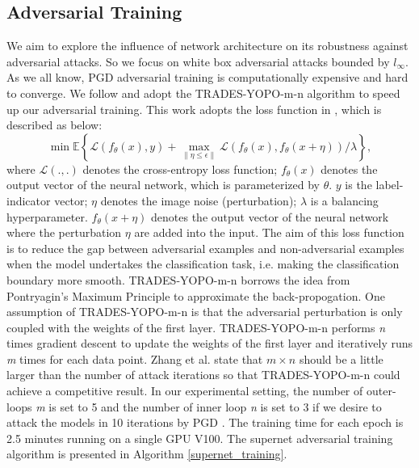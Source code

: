 \documentclass[journal]{IEEEtran}
\newcommand{\revised}[1]{{\color{black} #1}}
\begin{document}
\subsection{\textbf{Adversarial Training}}
We aim to explore the influence of network architecture on its robustness against adversarial attacks. So we focus on white box adversarial attacks bounded by $l_{\infty}$. As we all know, PGD \cite{madry:madry2017towards} adversarial training is computationally expensive and hard to converge. We follow \cite{zhang:zhang2019theoretically, zhang:zhang2019you} and adopt the TRADES-YOPO-m-n algorithm \cite{zhang:zhang2019you} to speed up our adversarial training. This work adopts the loss function in \cite{zhang:zhang2019theoretically}, which is described as below:
\begin{equation} \label{eq:trades}
    \min \mathbb{E}\left \{\mathcal{L}(f_{\theta}(x), y) + \max_{\left \|\eta \leq \epsilon  \right \|}\mathcal{L}(f_{\theta}(x), f_{\theta}(x + \eta))/\lambda \right \},
\end{equation}
\revised{where $\mathcal{L}\left ( .,. \right )$ denotes the cross-entropy loss function; $f_{\theta}(x)$ denotes the output vector of the neural network, which is parameterized by $\theta$. $y$ is the label-indicator vector; $\eta$ denotes the image noise (perturbation); $\lambda$ is a balancing hyperparameter. $f_{\theta}(x + \eta)$ denotes the output vector of the neural network where the perturbation $\eta$ are added into the input. The aim of this loss function is to reduce the gap between adversarial examples and non-adversarial examples when the model undertakes the classification task, i.e. making the classification boundary more smooth.} TRADES-YOPO-m-n borrows the idea from Pontryagin's Maximum Principle \cite{kopp1962pontryagin} to approximate the back-propogation. One assumption of TRADES-YOPO-m-n is that the adversarial perturbation is only coupled with the weights of the first layer. TRADES-YOPO-m-n performs \textit{n} times gradient descent to update the weights of the first layer and iteratively runs \textit{m} times for each data point. Zhang et al. \cite{zhang:zhang2019you} state that $m\times n$ should be a little larger than the number of attack iterations so that TRADES-YOPO-m-n could achieve a competitive result. In our experimental setting, the number of outer-loops \textit{m} is set to 5 and the number of inner loop \textit{n} is set to 3 if we desire to attack the models in 10 iterations by PGD \cite{madry:madry2017towards}. The training time for each epoch is 2.5 minutes running on a single GPU V100. The supernet adversarial training algorithm is presented in Algorithm \ref{supernet_training}.
\end{document}
